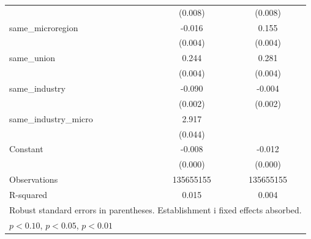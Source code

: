 \begin{table}[htbp]
\begin{tabular}{l*{2}{c}}
                    &     (0.008)         &     (0.008)         \\
[1em]
same\_microregion    &      -0.016\sym{***}&       0.155\sym{***}\\
                    &     (0.004)         &     (0.004)         \\
[1em]
same\_union          &       0.244\sym{***}&       0.281\sym{***}\\
                    &     (0.004)         &     (0.004)         \\
[1em]
same\_industry       &      -0.090\sym{***}&      -0.004\sym{*}  \\
                    &     (0.002)         &     (0.002)         \\
[1em]
same\_industry\_micro &       2.917\sym{***}&                     \\
                    &     (0.044)         &                     \\
[1em]
Constant            &      -0.008\sym{***}&      -0.012\sym{***}\\
                    &     (0.000)         &     (0.000)         \\
\hline
Observations        &   135655155         &   135655155         \\
R-squared           &       0.015         &       0.004         \\
\hline\hline
\multicolumn{3}{l}{\footnotesize Robust standard errors in parentheses. Establishment i fixed effects absorbed.}\\
\multicolumn{3}{l}{\footnotesize \sym{*} \(p<0.10\), \sym{**} \(p<0.05\), \sym{***} \(p<0.01\)}\\
\end{tabular}
\end{table}
